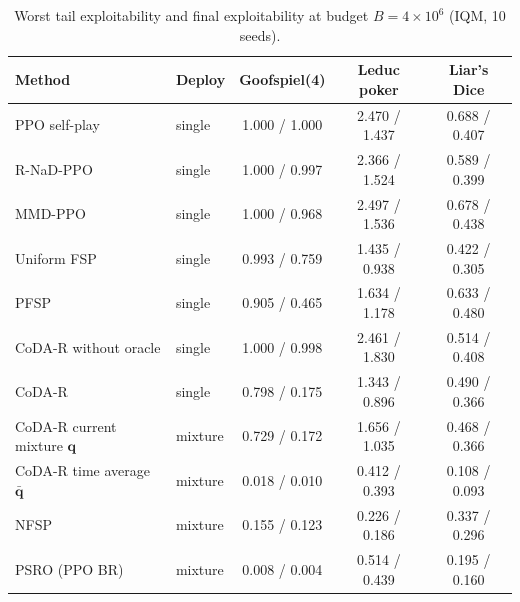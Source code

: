 \documentclass{article} %
\theoremstyle{plain}
\theoremstyle{remark}
\newcommand{\bq}{{\bm{q}}}
\newcommand{\codar}{CoDA-R}
\newcommand{\rnad}{R-NaD-PPO}
\begin{document}
\begin{table}[!htbp]
\caption{Worst tail exploitability and final exploitability at budget $B=4\times10^6$ (IQM, 10 seeds).}
\label{tab:main-full}
\begin{center}
\footnotesize
\begin{tabular}{llccc}
\toprule
Method & Deploy & Goofspiel(4) & Leduc poker & Liar's Dice \\
\midrule
PPO self-play & single & 1.000 / 1.000 & 2.470 / 1.437 & 0.688 / 0.407 \\
\rnad{} & single & 1.000 / 0.997 & 2.366 / 1.524 & 0.589 / 0.399 \\
MMD-PPO & single & 1.000 / 0.968 & 2.497 / 1.536 & 0.678 / 0.438 \\
Uniform FSP & single & 0.993 / 0.759 & 1.435 / 0.938 & 0.422 / 0.305 \\
PFSP & single & 0.905 / 0.465 & 1.634 / 1.178 & 0.633 / 0.480 \\
\codar{} without oracle & single & 1.000 / 0.998 & 2.461 / 1.830 & 0.514 / 0.408 \\
\codar{} & single & 0.798 / 0.175 & 1.343 / 0.896 & 0.490 / 0.366 \\
\midrule
\codar{} current mixture $\bq$ & mixture & 0.729 / 0.172 & 1.656 / 1.035 & 0.468 / 0.366 \\
\codar{} time average $\bar{\bq}$ & mixture & 0.018 / 0.010 & 0.412 / 0.393 & 0.108 / 0.093 \\
NFSP & mixture & 0.155 / 0.123 & 0.226 / 0.186 & 0.337 / 0.296 \\
PSRO (PPO BR) & mixture & 0.008 / 0.004 & 0.514 / 0.439 & 0.195 / 0.160 \\
\bottomrule
\end{tabular}
\end{center}
\end{table}
\end{document}
